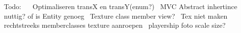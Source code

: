 Todo\+:~\newline
~\newline
 Optimaliseren transX en transY(enum?)~\newline
 M\+VC Abstract inhertince nuttig? of is Entity genoeg~\newline
 Texture class member view?~\newline
 Tex niet maken rechtstreeks memberclasses texture aanroepen~\newline
 playership foto scale size?~\newline
 